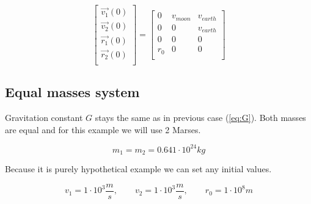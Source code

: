 \documentclass[english,12pt,a4paper]{report}
\begin{document}
	\begin{equation}
		\begin{bmatrix}
			\vec{v_1}(0)\\
			\vec{v_2}(0)\\
			\vec{r_1}(0)\\
			\vec{r_2}(0)\\
		\end{bmatrix}
		=
		\begin{bmatrix}
			0 & v_{moon} & v_{earth}\\
			0 & 0 & v_{earth}\\
			0 & 0 & 0\\
			r_0 & 0 & 0\\
		\end{bmatrix}
	\end{equation}
	
	\subsection{Equal masses system}
	
	Gravitation constant $G$ stays the same as in previous case (\ref{eq:G}). Both masses are equal and for this example we will use 2 Marses.
	
	$$ m_1 = m_2 = 0.641 \cdot 10^{24} kg $$
	
	Because it is purely hypothetical example we can set any initial values. 
	
	$$
	v_{1} = 1 \cdot 10^3 \frac{m}{s}
	, \qquad v_{2} = 1 \cdot 10^3 \frac{m}{s}
	, \qquad r_0 = 1 \cdot 10^{8} m
	$$
		
\end{document}
